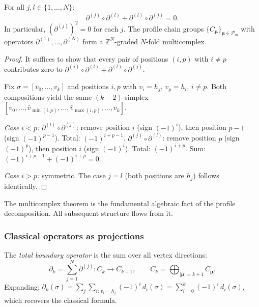\begin{theorem}\label{thm:multicomplex}
For all $j, l \in \{1, \ldots, N\}$:
\[
  \boxed{\partial^{(j)} \circ \partial^{(l)} + \partial^{(l)} \circ \partial^{(j)} = 0.}
\]
In particular, $(\partial^{(j)})^2 = 0$ for each $j$. The profile chain groups $\{C_{\boldsymbol{\mu}}\}_{\boldsymbol{\mu} \in \mathcal{P}_m}$ with operators $\partial^{(1)}, \ldots, \partial^{(N)}$ form a $\mathbb{Z}^N$-graded $N$-fold multicomplex.
\end{theorem}

\begin{proof}
It suffices to show that every pair of positions $(i, p)$ with $i \neq p$ contributes zero to $\partial^{(j)} \circ \partial^{(l)} + \partial^{(l)} \circ \partial^{(j)}$.

Fix $\sigma = [v_0, \ldots, v_k]$ and positions $i, p$ with $v_i = h_j$, $v_p = h_l$, $i \neq p$. Both compositions yield the same $(k{-}2)$-simplex $[v_0, \ldots, \hat{v}_{\min(i,p)}, \ldots, \hat{v}_{\max(i,p)}, \ldots, v_k]$.

\emph{Case $i < p$:} $\partial^{(l)} \circ \partial^{(j)}$: remove position $i$ (sign $(-1)^i$), then position $p{-}1$ (sign $(-1)^{p-1}$). Total: $(-1)^{i+p-1}$. $\partial^{(j)} \circ \partial^{(l)}$: remove position $p$ (sign $(-1)^p$), then position $i$ (sign $(-1)^{i}$). Total: $(-1)^{i+p}$. Sum: $(-1)^{i+p-1} + (-1)^{i+p} = 0$.

\emph{Case $i > p$:} symmetric. The case $j = l$ (both positions are $h_j$) follows identically.
\end{proof}

The multicomplex theorem is the fundamental algebraic fact of the profile decomposition. All subsequent structure flows from it.

\subsubsection*{Classical operators as projections}

\begin{definition}\label{def:total-boundary}
\label{def:boundary}
The \emph{total boundary operator} is the sum over all vertex directions:
\[
  \partial_k = \sum_{j=1}^{N} \partial^{(j)}: C_k \to C_{k-1},
  \qquad C_k = \bigoplus_{|\boldsymbol{\mu}| = k+1} C_{\boldsymbol{\mu}}.
\]
Expanding: $\partial_k(\sigma) = \sum_{j} \sum_{i:\,v_i = h_j} (-1)^i\, d_i(\sigma) = \sum_{i=0}^{k} (-1)^i\, d_i(\sigma)$, which recovers the classical formula.
\end{definition}

